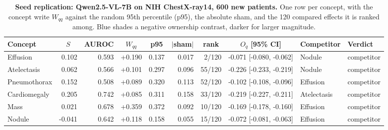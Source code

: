\begin{table}[t]
\centering
\scriptsize
\setlength{\tabcolsep}{4pt}

\caption{\textbf{Seed replication: Qwen2.5-VL-7B on NIH ChestX-ray14, 600 new patients.} One row per concept, with the concept write $W_{qq}$ against the random 95th percentile (p95), the absolute sham, and the 120 compared effects it is ranked among. Blue shades a negative ownership contrast, darker for larger magnitude.}
\label{tab:cf-seed}
\begin{tabular}{lrrrrrrrll}
\toprule
Concept & \multicolumn{1}{c}{$S$} & \multicolumn{1}{c}{AUROC} & \multicolumn{1}{c}{$W_{qq}$} & \multicolumn{1}{c}{p95} & \multicolumn{1}{c}{$|$sham$|$} & \multicolumn{1}{c}{rank} & \multicolumn{1}{c}{$O_q$ [95\% CI]} & Competitor & Verdict\\
\midrule
Effusion & 0.102 & 0.593 & +0.190 & 0.137 & 0.017 & 2/120 & \cellcolor{cfSlate2}-0.071 [-0.080, -0.062] & Nodule & competitor \\
Atelectasis & 0.062 & 0.566 & +0.101 & 0.297 & 0.096 & 55/120 & \cellcolor{cfSlate3}-0.226 [-0.233, -0.219] & Nodule & competitor \\
Pneumothorax & 0.152 & 0.508 & +0.089 & 0.320 & 0.113 & 52/120 & \cellcolor{cfSlate3}-0.102 [-0.108, -0.096] & Effusion & competitor \\
Cardiomegaly & 0.205 & 0.742 & +0.085 & 0.311 & 0.158 & 33/120 & \cellcolor{cfSlate3}-0.219 [-0.227, -0.211] & Atelectasis & competitor \\
Mass & 0.021 & 0.678 & +0.359 & 0.372 & 0.092 & 10/120 & \cellcolor{cfSlate3}-0.169 [-0.178, -0.160] & Effusion & competitor \\
Nodule & -0.041 & 0.642 & +0.118 & 0.158 & 0.055 & 15/120 & \cellcolor{cfSlate2}-0.072 [-0.081, -0.063] & Effusion & competitor \\
\bottomrule
\end{tabular}
\end{table}
